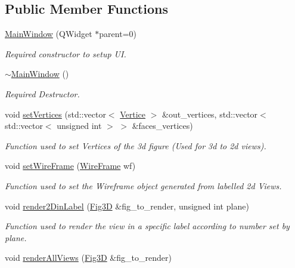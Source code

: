 \subsection*{Public Member Functions}
\begin{DoxyCompactItemize}
\item 
\hyperlink{classMainWindow_a8b244be8b7b7db1b08de2a2acb9409db}{Main\+Window} (Q\+Widget $\ast$parent=0)
\begin{DoxyCompactList}\small\item\em Required constructor to setup UI. \end{DoxyCompactList}\item 
\hyperlink{classMainWindow_ae98d00a93bc118200eeef9f9bba1dba7}{$\sim$\+Main\+Window} ()
\begin{DoxyCompactList}\small\item\em Required Destructor. \end{DoxyCompactList}\item 
void \hyperlink{classMainWindow_ad61780253f03d8089d2e928a3113baf8}{set\+Vertices} (std\+::vector$<$ \hyperlink{structVertice}{Vertice} $>$ \&out\+\_\+vertices, std\+::vector$<$ std\+::vector$<$ unsigned int $>$ $>$ \&faces\+\_\+vertices)
\begin{DoxyCompactList}\small\item\em Function used to set Vertices of the 3d figure (Used for 3d to 2d views). \end{DoxyCompactList}\item 
void \hyperlink{classMainWindow_a9a9324e1f5908834f69b5a7944fcbc38}{set\+Wire\+Frame} (\hyperlink{classWireFrame}{Wire\+Frame} wf)
\begin{DoxyCompactList}\small\item\em Function used to set the Wireframe object generated from labelled 2d Views. \end{DoxyCompactList}\item 
void \hyperlink{classMainWindow_abfa616ee6054f649786c044555289380}{render2\+Din\+Label} (\hyperlink{classFig3D}{Fig3D} \&fig\+\_\+to\+\_\+render, unsigned int plane)
\begin{DoxyCompactList}\small\item\em Function used to render the view in a specific label according to number set by plane. \end{DoxyCompactList}\item 
void \hyperlink{classMainWindow_a8c1191ba31eb843bede258cd5fdc571e}{render\+All\+Views} (\hyperlink{classFig3D}{Fig3D} \&fig\+\_\+to\+\_\+render)

\end{DoxyCompactItemize}
